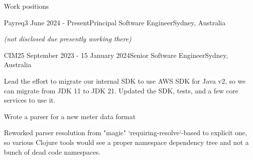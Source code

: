 \documentclass{resume} %
\begin{document}

\begin{rSection}{Work positions}

\begin{rSubsection}{Payreq}{3 June 2024 - Present}{Principal Software Engineer}{Sydney, Australia} %

\item {\it (not disclosed due presently working there)}
~
\end{rSubsection}

\begin{rSubsection}{CIM}{25 September 2023 - 15 January 2024}{Senior Software Engineer}{Sydney, Australia} %
\item Lead the effort to migrate our internal SDK to use AWS SDK for Java v2, so we can migrate from JDK 11 to JDK 21.
    Updated the SDK, tests, and a few core services to use it.
\item Wrote a parser for a new meter data format
\item Reworked parser resolution from "magic" `requiring-resolve`-based to explicit one, so various Clojure
    tools would see a proper namespace dependency tree and not a bunch of dead code namespaces.
~
\end{rSubsection}


\end{rSection}
\end{document}
